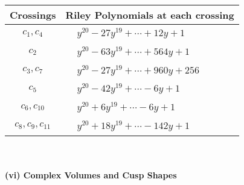 \documentclass[1p]{elsarticle_modified}
\theoremstyle{definition}
\begin{document}
\begin{tabular}{m{50pt}|m{274pt}}
Crossings & \hspace{64pt}Riley Polynomials at each crossing \\
\hline $$\begin{aligned}c_{1},c_{4}\end{aligned}$$&$\begin{aligned}
&y^{20}-27 y^{19}+\cdots+12 y+1
\end{aligned}$\\
\hline $$\begin{aligned}c_{2}\end{aligned}$$&$\begin{aligned}
&y^{20}-63 y^{19}+\cdots+564 y+1
\end{aligned}$\\
\hline $$\begin{aligned}c_{3},c_{7}\end{aligned}$$&$\begin{aligned}
&y^{20}-27 y^{19}+\cdots+960 y+256
\end{aligned}$\\
\hline $$\begin{aligned}c_{5}\end{aligned}$$&$\begin{aligned}
&y^{20}-42 y^{19}+\cdots-6 y+1
\end{aligned}$\\
\hline $$\begin{aligned}c_{6},c_{10}\end{aligned}$$&$\begin{aligned}
&y^{20}+6 y^{19}+\cdots-6 y+1
\end{aligned}$\\
\hline $$\begin{aligned}c_{8},c_{9},c_{11}\end{aligned}$$&$\begin{aligned}
&y^{20}+18 y^{19}+\cdots-142 y+1
\end{aligned}$\\
\hline
\end{tabular}\\~\\
\newpage\flushleft \textbf{(vi) Complex Volumes and Cusp Shapes}
\end{document}
